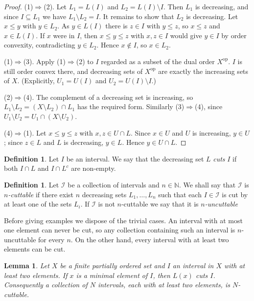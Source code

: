 \documentclass[10pt, a4paper]{article}
\theoremstyle{plain}
\newtheorem{lemma}[theorem]{Lemma}
\theoremstyle{definition}
\newtheorem{definition}[theorem]{Definition}
\newcommand{\I}{\mathcal{I}}
\newcommand{\NN}{\mathbb{N}}
\begin{document}
\begin{proof}
  (1)$\Rightarrow$(2). Let $L_1 = L(I)$ and $L_2 = L(I)\setminus I$. Then $L_1$ is
  decreasing, and since $I\subseteq L_1$ we have $L_1\setminus L_2 = I$. It remains to
  show that $L_2$ is decreasing. Let $x\le y$ with $y\in L_2$. As $y\in L(I)$ there is
  $z\in I$ with $y\le z$, so $x\le z$ and $x\in L(I)$. If $x$ were in $I$, then
  $x\le y\le z$ with $x,z\in I$ would give $y\in I$ by order convexity, contradicting
  $y\in L_2$. Hence $x\notin I$, so $x\in L_2$.

  (1)$\Rightarrow$(3). Apply (1)$\Rightarrow$(2) to $I$ regarded as a subset of the
  dual order $X^{\mathrm{op}}$. $I$ is still order convex there, and decreasing sets of
  $X^{\mathrm{op}}$ are exactly the increasing sets of $X$. (Explicitly,
  $U_1=U(I)$ and $U_2=U(I)\setminus I$.)

  (2)$\Rightarrow$(4). The complement of a decreasing set is increasing, so
  $L_1\setminus L_2 = (X\setminus L_2)\cap L_1$ has the required form. Similarly
  (3)$\Rightarrow$(4), since $U_1\setminus U_2 = U_1\cap(X\setminus U_2)$.

  (4)$\Rightarrow$(1). Let $x\le y\le z$ with $x,z\in U\cap L$. Since $x\in U$ and
  $U$ is increasing, $y\in U$; since $z\in L$ and $L$ is decreasing, $y\in L$.
  Hence $y\in U\cap L$.
\end{proof}

\begin{definition}
  Let $I$ be an interval. We say that the decreasing set $L$ \emph{cuts} $I$
  if both $I\cap L$ and $I\cap L^c$ are non-empty.
\end{definition}

\begin{definition}
  Let $\I$ be a collection of intervals and $n\in\NN$. We shall say that
  $\I$ is \emph{$n$-cuttable} if there exist $n$ decreasing sets $L_1, \ldots, L_n$
  such that each $I\in\I$ is cut by at least one of the sets $L_i$. If $\I$ is not $n$-cuttable
  we say that it is \emph{$n$-uncuttable}
\end{definition}

Before giving examples we dispose of the trivial cases. An interval with at most one
element can never be cut, so any collection containing such an interval is
$n$-uncuttable for every $n$. On the other hand, every interval with at least two
elements can be cut.

\begin{lemma}\label{lem:single-cut}
  Let $X$ be a finite partially ordered set and $I$ an interval in $X$ with at least
  two elements. If $x$ is a minimal element of $I$, then $L(x)$ cuts $I$. Consequently
  a collection of $N$ intervals, each with at least two elements, is $N$-cuttable.
\end{lemma}
\end{document}
